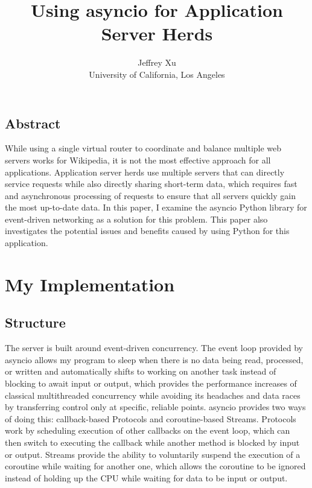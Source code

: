 \documentclass[letterpaper,twocolumn,10pt]{article}
\begin{document}
\date{}

\title{\Large \bf Using asyncio for Application Server Herds}

\author{
{\rm Jeffrey Xu}\\
University of California, Los Angeles
} %

\maketitle

\thispagestyle{empty}


\subsection*{Abstract}
While using a single virtual router to coordinate and balance multiple web servers works for Wikipedia, it is not the most effective approach for all applications.
Application server herds use multiple servers that can directly service requests while also directly sharing short-term data, which requires fast and asynchronous processing of requests to ensure that all servers quickly gain the most up-to-date data.
In this paper, I examine the asyncio Python library for event-driven networking as a solution for this problem. This paper also investigates the potential issues and benefits caused by using Python for this application.

\section{My Implementation}
\subsection{Structure}
The server is built around event-driven concurrency. The event loop provided by asyncio allows my program to sleep when there is no data being read, processed, or written and automatically shifts to working on another task instead of blocking to await input or output, which provides the performance increases of classical multithreaded concurrency while avoiding its headaches and data races by transferring control only at specific, reliable points. asyncio provides two ways of doing this: callback-based Protocols and coroutine-based Streams. Protocols work by scheduling execution of other callbacks on the event loop, which can then switch to executing the callback while another method is blocked by input or output. Streams provide the ability to voluntarily suspend the execution of a coroutine while waiting for another one, which allows the coroutine to be ignored instead of holding up the CPU while waiting for data to be input or output.\\
\end{document}
